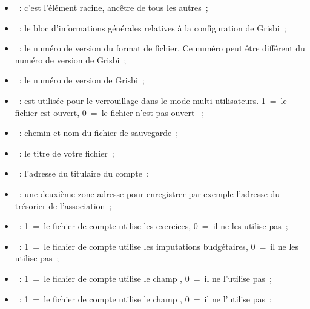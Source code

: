 \begin{itemize}

\item {}~: c'est l'élément racine, ancêtre de tous les autres~;

\item {}~: le bloc d'informations générales
relatives à la configuration de Grisbi~;

\item {}~: le numéro de version 
du format de fichier. Ce numéro peut être différent du numéro de version de Grisbi~;

\item {}~: le numéro de version de Grisbi~;

\item {}~: est utilisée pour le
verrouillage dans le mode multi-utilisateurs. 1~=~le fichier est ouvert, 
0~=~le fichier n'est pas ouvert ~;

\item {}~: chemin et nom du fichier de 
sauvegarde~;

\item {}~: le titre de votre fichier~;

\item {}~: l'adresse du titulaire du
compte~;

\item {}~: une deuxième zone 
adresse pour enregistrer par exemple l'adresse du trésorier de l'association~;

\item {}~: 1~=~le fichier de compte
utilise les exercices, 0~=~il ne les utilise pas~;

\item {}~: 1~=~le fichier de compte
utilise les imputations budgétaires, 0~=~il ne les utilise pas~;

\item {}~: 1~=~le fichier de compte
utilise le champ , 0~=~il ne l'utilise pas~;

\item {}~: 1~=~le fichier de compte
utilise le champ , 0~=~il ne l'utilise pas~;


\end{itemize}
